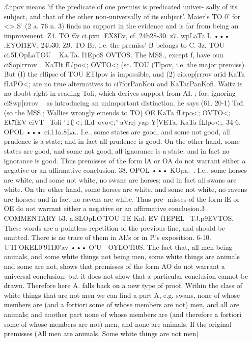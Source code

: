 {{{{£npov means 'if the predicate of one premiss is predicated univer-
sally of its subject, and that of the other non-universally of its
subject'. Maier's TO 0' for <> S' (2 a. 76 n. 3) finds no support in
the evidence and is far from being an improvement.
Z4. TO €v ci.pxn }.EX8Ev, cf. 24b28-30.
z7. wpLaTa.L ••• }.EYOI1EV, 24b30.
Z9. TO Br, i.e. the premiss' B belongs to C.
3z. TOU ci.5LOpLaTOU ~ Ka.Ta. I1EpoS OVTOS. The MSS., except f,
have oun ciSop[rrrov ~ KaTlt fLlpo<; OVTO<; (sc. TOU (Tlpov, i.e. the major
premiss). But (I) the ellipse of TOU ETlpov is impossible, and (2)
cio,op[rrrov arid KaTa fLtPO<; are no true alternatives to ci7forPanKou
and KaTarPanKofi. Waitz is no doubt right in reading Tofi, which
derives support from AI. ; for, ignoring ciSwp[rrrov ~ as introducing
an unimportant distinction, he says (61. 20-1) Tofi (so the MSS.;
Wallies wrongly emends to TO) OE KaTa fLtpo<; OVTO<; Et7fEV ciVT~
Tofi 'Tfj<; fLd~ovo<;"
aVrrj
yap Y[VETa, KaTa fLlpo<;.
34-6. OPOL ••• ci.11a.8La.. I.e., some states are good, and some
not good, all prudence is a state; and in fact all prudence is good.
On the other hand, some states are good, and some not good,
all ignorance is a state; and in fact no ignorance is good. Thus
premisses of the form lA or OA do not warrant either a negative
or an affirmative conclusion.
38. OPOL ••• KOpa.~. I.e., some horses are white, and some not
white, no swans are horses; and in fact all swans are white. On
the other hand, some horses are white, and some not white, no
ravens are horses; and in fact no ravens are white. Thus pre-
misses of the form lE or OE do not warrant either a negative
or an affirmative conclusion.3~
COMMENTARY
b3. a.SLOpLO'TOU TE Kal. EV f1EPEL ~TJ.p9EVTOS. These words are a
pointless repetition of the previous line, and should be omitted.
There is no trace of them in Al.'s or in P.'s exposition.
6-10. U'I1'OKEL0'911l0'av ••• O'U~~OYLO'f10S. The fact that, all men
being animals, and some white things not being men, some white
things are animals and some are not, shows that premisses of
the form AO do not warrant a universal conclusion; but it does
not show that a particular conclusion cannot be drawn. Therefore
here A. falls back on a new type of proof. Within the class of
white things that are not men we can find a part A, e.g. swans,
none of whose members are (and a fortiori some of whose members
are not) men, and all are animals; and another part none of
whose members are (and therefore a fortiori some of whose
members are not) men, and none are animals. If the original
premisses (All men are animals, Some white things are not men)
}}
